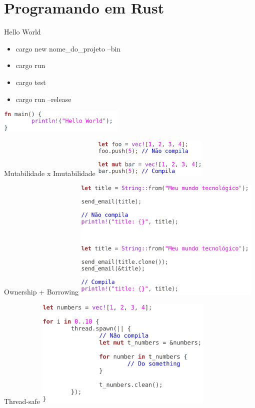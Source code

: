 \documentclass[aspectratio=169]{beamer}
\begin{document}
\section{Programando em Rust}
\begin{frame}{Hello World}
	\begin{itemize}
		\item cargo new nome\_do\_projeto --bin
		\item cargo run
		\item cargo test
		\item cargo run --release
	\end{itemize}
	
	\vspace{1cm}
	
	\includegraphics[width=6.0cm]{imgs/hello_world.png}	
\end{frame}

\begin{frame}{Mutabilidade x Imutabilidade}
	\includegraphics[width=5.5cm]{imgs/mut_x_imut.png}	
\end{frame}

\begin{frame}{Ownership + Borrowing}
	\includegraphics[width=9cm]{imgs/owership_borrowing.png}	
\end{frame}

\begin{frame}{Thread-safe}
	\includegraphics[width=8.5cm]{imgs/thread_safe.png}	
\end{frame}
\end{document}
